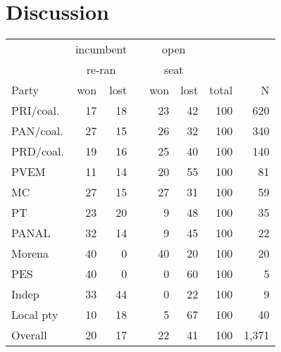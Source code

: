 \documentclass[letter,12pt]{article}
\begin{document}
\section{Discussion}

\begin{tabular}{lrrcrrrr}
          & \multicolumn{2}{c}{incumbent} && \multicolumn{2}{c}{open} & & \\ 
          & \multicolumn{2}{c}{re-ran}    && \multicolumn{2}{c}{seat} & & \\ \cline{2-3} \cline{5-6}
Party     & won & lost && won & lost & total & N   \\ \hline
PRI/coal. & 17  & 18   && 23  & 42   & 100   & 620 \\
PAN/coal. & 27  & 15   && 26  & 32   & 100   & 340 \\
PRD/coal. & 19  & 16   && 25  & 40   & 100   & 140 \\
PVEM      & 11  & 14   && 20  & 55   & 100   & 81  \\
MC        & 27  & 15   && 27  & 31   & 100   & 59  \\
PT        & 23  & 20   && 9   & 48   & 100   & 35  \\
PANAL     & 32  & 14   && 9   & 45   & 100   & 22  \\
Morena    & 40  & 0    && 40  & 20   & 100   & 20  \\
PES       & 40  & 0    && 0   & 60   & 100   & 5   \\
Indep     & 33  & 44   && 0   & 22   & 100   & 9   \\
Local pty & 10  & 18   && 5   & 67   & 100   & 40  \\ \hline
Overall   & 20  & 17   && 22  & 41   & 100   & 1,371  \\ 
\end{tabular}




\end{document}
